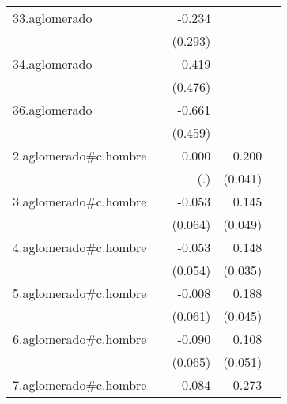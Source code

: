 {\begin{longtable}{l*{4}{D{.}{.}{-1}}}
\addlinespace
33.aglomerado&                     &      -0.234         &                     &                     \\
            &                     &     (0.293)         &                     &                     \\
\addlinespace
34.aglomerado&                     &       0.419         &                     &                     \\
            &                     &     (0.476)         &                     &                     \\
\addlinespace
36.aglomerado&                     &      -0.661         &                     &                     \\
            &                     &     (0.459)         &                     &                     \\
\addlinespace
2.aglomerado#c.hombre&                     &       0.000         &       0.200\sym{***}&                     \\
            &                     &         (.)         &     (0.041)         &                     \\
\addlinespace
3.aglomerado#c.hombre&                     &      -0.053         &       0.145\sym{**} &                     \\
            &                     &     (0.064)         &     (0.049)         &                     \\
\addlinespace
4.aglomerado#c.hombre&                     &      -0.053         &       0.148\sym{***}&                     \\
            &                     &     (0.054)         &     (0.035)         &                     \\
\addlinespace
5.aglomerado#c.hombre&                     &      -0.008         &       0.188\sym{***}&                     \\
            &                     &     (0.061)         &     (0.045)         &                     \\
\addlinespace
6.aglomerado#c.hombre&                     &      -0.090         &       0.108\sym{*}  &                     \\
            &                     &     (0.065)         &     (0.051)         &                     \\
\addlinespace
7.aglomerado#c.hombre&                     &       0.084         &       0.273\sym{***}&                     \\

\end{longtable}}
